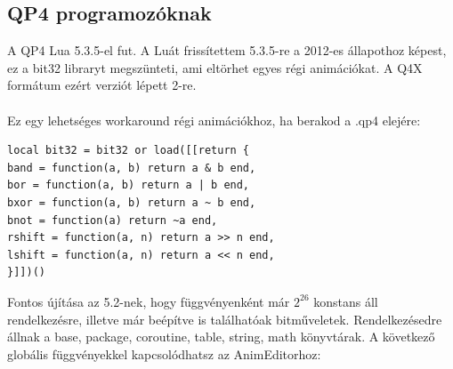 \documentclass[a4paper,12pt,release]{article}
\begin{document}
\subsection{QP4 programozóknak}
A QP4 Lua 5.3.5-el fut. A Luát frissítettem 5.3.5-re a 2012-es állapothoz képest, ez a bit32 libraryt megszünteti, ami eltörhet egyes régi animációkat. A Q4X formátum ezért verziót lépett 2-re.
\\
\\Ez egy lehetséges workaround régi animációkhoz, ha berakod a .qp4 elejére:
\begin{verbatim}
local bit32 = bit32 or load([[return {
band = function(a, b) return a & b end,
bor = function(a, b) return a | b end,
bxor = function(a, b) return a ~ b end,
bnot = function(a) return ~a end,
rshift = function(a, n) return a >> n end,
lshift = function(a, n) return a << n end,
}]])()
\end{verbatim}
Fontos újítása az 5.2-nek, hogy függvényenként már $2^{26}$ konstans áll rendelkezésre, illetve már beépítve is találhatóak bitműveletek. Rendelkezésedre állnak a base, package, coroutine, table, string, math könyvtárak.
A következő globális függvényekkel kapcsolódhatsz az AnimEditorhoz:
\end{document}
